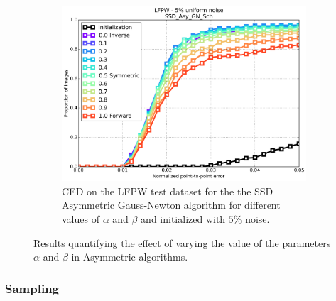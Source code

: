 \begin{figure}[h!]
	\begin{subfigure}{0.48\textwidth}
	    \includegraphics[width=\textwidth]{experiments/alpha/ced_ssd_asy_gn_5.png}
	    \caption{CED on the LFPW test dataset for the the SSD Asymmetric Gauss-Newton algorithm for different values of $\alpha$ and $\beta$ and initialized with $5\%$ noise.}
	    \label{fig:ced_po_inv_gn}
	\end{subfigure}
	\label{fig:alpha}
	\caption{Results quantifying the effect of varying the value of the parameters $\alpha$ and $\beta$ in Asymmetric algorithms.}
\end{figure}



\subsubsection{Sampling}

